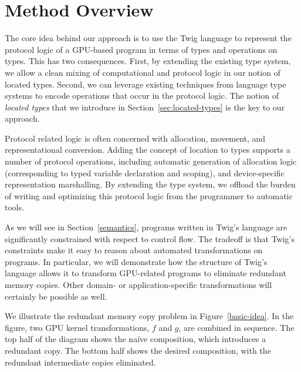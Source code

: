 
\section{Method Overview}

The core idea behind our approach is to use the Twig language to
represent the protocol logic of a GPU-based program in terms of types
and operations on types.  This has two consequences. First, by
extending the existing type system, we allow a clean mixing of
computational and protocol logic in our notion of located
types. Second, we can leverage existing techniques from language type
systems to encode operations that occur in the protocol logic. The
notion of \emph{located types} that we introduce in
Section~\ref{sec:located-types} is the key to our approach.

Protocol related logic is often concerned with allocation, movement,
and representational conversion. Adding the concept of location to
types supports a number of protocol operations, including automatic
generation of allocation logic (corresponding to typed variable
declaration and scoping), and device-specific representation
marshalling. By extending the type system, we offload the burden of
writing and optimizing this protocol logic from the programmer to
automatic tools.

As we will see in Section~\ref{semantics}, programs written in Twig's
language are significantly constrained with respect to control
flow. The tradeoff is that Twig's constraints make it easy to reason
about automated transformations on programs. In particular, we will
demonstrate how the structure of Twig's language allows it to
transform GPU-related programs to eliminate redundant memory
copies. Other domain- or application-specific transformations will
certainly be possible as well.

We illustrate the redundant memory copy problem in
Figure~\ref{basic-idea}. In the figure, two GPU kernel
transformations, $f$ and $g$, are combined in sequence. The top half
of the diagram shows the na\"ive composition, which introduces a
redundant copy. The bottom half shows the desired composition, with
the redundant intermediate copies eliminated.

